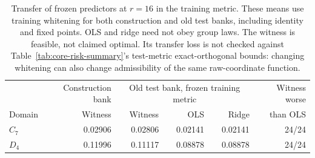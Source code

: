 \begin{table}[t]
\caption{Transfer of frozen predictors at $r=16$ in the training metric. These means use training whitening for both construction and old test banks, including identity and fixed points. OLS and ridge need not obey group laws. The witness is feasible, not claimed optimal. Its transfer loss is not checked against Table~\ref{tab:core-risk-summary}'s test-metric exact-orthogonal bounds: changing whitening can also change admissibility of the same raw-coordinate function.}
\label{tab:followup-witness}
\centering\small
\begin{tabular}{@{}lrrrrr@{}}
\toprule
& Construction bank & \multicolumn{3}{c}{Old test bank, frozen training metric} & Witness worse \\
Domain & Witness & Witness & OLS & Ridge & than OLS \\
\midrule
$C_7$ & 0.02906 & 0.02806 & 0.02141 & 0.02141 & 24/24 \\
$D_4$ & 0.11996 & 0.11117 & 0.08878 & 0.08878 & 24/24 \\
\bottomrule
\end{tabular}
\end{table}

